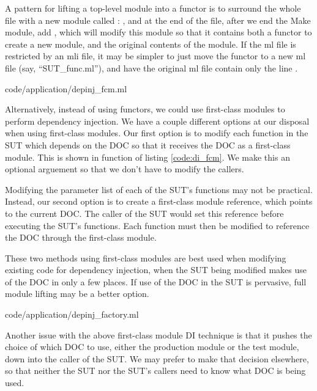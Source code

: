 A pattern for lifting a top-level module into a functor is to surround
the whole file with a new module called :
, and at the end of the file,
after we end the Make module, add , which will
modify this module so that it contains both a functor to create a new
module, and the original contents of the module. If the ml file is
restricted by an mli file, it may be simpler to just move the functor
to a new ml file (say, ``SUT\_func.ml''), and have the original ml
file contain only the line .

 {code/application/depinj_fcm.ml}

Alternatively, instead of using functors, we could use first-class
modules to perform dependency injection. We have a couple different
options at our disposal when using first-class modules. Our first
option is to modify each function in the SUT which depends on the DOC
so that it receives the DOC as a first-class module. This is shown in
function  of listing \ref{code:di_fcm}. We make this an
optional arguement so that we don't have to modify the callers.

Modifying the parameter list of each of the SUT's functions may not be
practical. Instead, our second option is to create a first-class
module reference, which points to the current DOC. The caller of the
SUT would set this reference before executing the SUT's
functions. Each function must then be modified to reference the DOC
through the first-class module.

These two methods using first-class modules are best used when
modifying existing code for dependency injection, when the SUT being
modified makes use of the DOC in only a few places. If use of the DOC
in the SUT is pervasive, full module lifting may be a better option.

 {code/application/depinj_factory.ml}

Another issue with the above first-class module DI technique is that
it pushes the choice of which DOC to use, either the production module
or the test module, down into the caller of the SUT. We may prefer to
make that decision elsewhere, so that neither the SUT nor the SUT's
callers need to know what DOC is being used.

